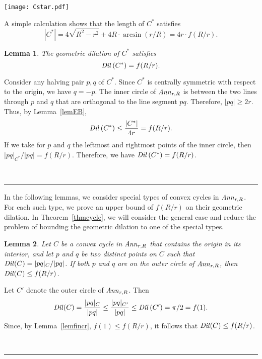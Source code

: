 \documentclass[12pt]{article}
\newtheorem{lemma}{Lemma}
\newcommand{\Ann}{\mathord{\it Ann}}
\newcommand{\Dil}{\mathord{\it Dil}}
\newcommand{\qed}{\rule{0.5em}{1.5ex}}
\newcommand{\fqed}{{\hfill~\qed}}
\newenvironment{proof}{{\noindent \bf Proof.}}
                      {{\hfill \fqed} \vspace{1em}}
\begin{document}
\begin{center}
   \texttt{[image: Cstar.pdf]}
\end{center}

A simple calculation shows that the length of $C^*$ satisfies 
\[ | C^* | = 4 \sqrt{R^2-r^2} + 4R \cdot \arcsin(r/R) = 
           4r \cdot f(R/r) . 
\] 

\begin{lemma}  \label{lemCstar} 
The geometric dilation of $C^*$ satisfies 
\[ \Dil \left( C^* \right) = f(R/r) . 
\] 
\end{lemma} 
\begin{proof} 
Consider any halving pair $p,q$ of $C^*$. Since $C^*$ is centrally 
symmetric with respect to the origin, we have $q=-p$. The inner circle
of $\Ann_{r,R}$ is between the two lines through $p$ and $q$ that are 
orthogonal to the line segment $pq$. Therefore, $|pq| \geq 2r$. 
Thus, by Lemma~\ref{lemEB}, 
\[ \Dil \left( C^* \right) \leq \frac{|C^*|}{4r} = f(R/r) .  
\] 
If we take for $p$ and $q$ the leftmost and rightmost points of the inner 
circle, then $|pq|_{C^*} / |pq| = f(R/r)$. Therefore, we have 
$\Dil \left( C^* \right) = f(R/r)$. 
\end{proof}  

In the following lemmas, we consider special types of convex cycles in 
$\Ann_{r,R}$. For each such type, we prove an upper bound of $f(R/r)$ 
on their geometric dilation. In Theorem~\ref{thmcycle}, we will consider 
the general case and reduce the problem of bounding the geometric 
dilation to one of the special types.   

\begin{lemma}   \label{lemoutercircle} 
Let $C$ be a convex cycle in $\Ann_{r,R}$ that contains the origin in 
its interior, and let $p$ and $q$ be two distinct points on $C$ 
such that $\Dil(C) = |pq|_C / |pq|$. If both $p$ and $q$ are on the 
outer circle of $\Ann_{r,R}$, then $\Dil(C) \leq f(R/r)$. 
\end{lemma} 
\begin{proof} 
Let $C'$ denote the outer circle of $\Ann_{r,R}$. Then   
\[ \Dil(C) = \frac{|pq|_C}{|pq|} \leq \frac{|pq|_{C'}}{|pq|} \leq  
   \Dil \left( C' \right) = \pi/2 = f(1) . 
\] 
Since, by Lemma~\ref{lemfincr}, $f(1) \leq f(R/r)$, it follows that 
$\Dil(C) \leq f(R/r)$. 
\end{proof} 
\end{document}

